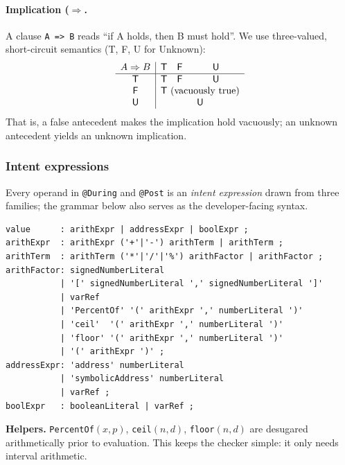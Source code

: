 \documentclass[10pt, conference]{IEEEtran}
\begin{document}
\paragraph{Implication (\texorpdfstring{$\Rightarrow$}).}
A clause \verb|A => B| reads “if A holds, then B must hold”.
We use three-valued, short-circuit semantics
(\textsf{T}, \textsf{F}, \textsf{U} for Unknown):
\[
\begin{array}{c|ccc}
A\Rightarrow B & \textsf{T} & \textsf{F} & \textsf{U} \\\hline
\textsf{T}      & \textsf{T} & \textsf{F} & \textsf{U}\\
\textsf{F}      & \multicolumn{3}{c}{\textsf{T} \text{ (vacuously true)}} \\
\textsf{U}      & \multicolumn{3}{c}{\textsf{U}}
\end{array}
\]
That is, a false antecedent makes the implication hold
vacuously; an unknown antecedent yields an unknown implication.

\subsubsection{Intent expressions}
\label{sec:intent-expr}
%
Every operand in \texttt{@During} and \texttt{@Post} is an
\emph{intent expression} drawn from three families; the grammar
below also serves as the developer-facing syntax.

\begin{lstlisting}[basicstyle=\scriptsize\ttfamily,frame=single]
value      : arithExpr | addressExpr | boolExpr ;
arithExpr  : arithExpr ('+'|'-') arithTerm | arithTerm ;
arithTerm  : arithTerm ('*'|'/'|'%') arithFactor | arithFactor ;
arithFactor: signedNumberLiteral
           | '[' signedNumberLiteral ',' signedNumberLiteral ']'
           | varRef
           | 'PercentOf' '(' arithExpr ',' numberLiteral ')'
           | 'ceil'  '(' arithExpr ',' numberLiteral ')'
           | 'floor' '(' arithExpr ',' numberLiteral ')'
           | '(' arithExpr ')' ;
addressExpr: 'address' numberLiteral
           | 'symbolicAddress' numberLiteral
           | varRef ;
boolExpr   : booleanLiteral | varRef ;
\end{lstlisting}

\noindent
\textbf{Helpers.}
\texttt{PercentOf$(x,p)$}, \texttt{ceil$(n,d)$}, \texttt{floor$(n,d)$}
are desugared arithmetically prior to evaluation.  This keeps the
checker simple: it only needs interval arithmetic.
\end{document}
